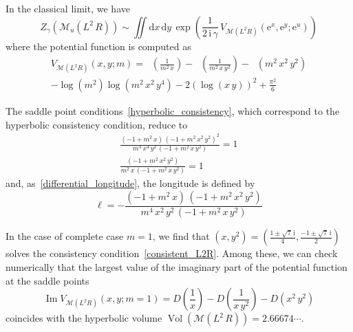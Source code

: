 \documentclass[12pt,reqno]{amsart}
\numberwithin{equation}{section}
\renewcommand{\Im}{\operatorname{Im}}
\DeclareMathOperator{\Li}{Li_2}
\DeclareMathOperator{\Vol}{Vol}
\newcommand{\I}{\mathrm{i}}
\newcommand{\E}{\mathrm{e}}
\begin{document}
In the classical limit, we have
\begin{equation}
  Z_\gamma \left( \mathcal{M}_u(L^2 \, R) \right)
  \sim
  \iint \mathrm{d} x \, \mathrm{d} y \,
  \exp \left(
    \frac{1}{2 \, \I \, \gamma} \,
    V_{\mathcal{M}(L^2 R)}(\E^x, \E^y; \E^u)
  \right)
\end{equation}
where  the potential function is computed as
\begin{multline}
  V_{\mathcal{M}(L^2 R)}(x,y;m)
  =
  \Li \left( \frac{1}{m^2 \, x} \right)
  - \Li \left( \frac{1}{ m^2 \, x \, y^2} \right)
  - \Li \left( m^2 \, x^2 \, y^2 \right)
  \\
  - \log \left( m^2 \right)
  \log \left( m^2 \, x^2 \, y^4 \right) 
  -
  2 \left(
    \log \left( x \, y \right)
  \right)^2 + \frac{\pi^2}{6}
\end{multline}



The saddle point conditions~\eqref{hyperbolic_consistency},
which correspond to the hyperbolic consistency condition,
reduce to
\begin{equation}
  \label{consistent_L2R}
  \begin{gathered}
    \frac{
      \left( -1 + m^2 \, x \right) \,
      \left( -1 + m^2 \, x^2 \, y^2 \right)^2
    }{
      m^4 \, x^4 \, y^2 \,
      \left( -1 + m^2 \, x \, y^2 \right)
    } = 1 \\[2mm]
%
    \frac{
      \left(-1 + m^2 \, x^2 \,y^2 \right)
    }{
      m^2 \, x \,  \left( -1 + m^2 \, x \, y^2  \right)
    }
    =1
  \end{gathered}
\end{equation}
and,
as~\eqref{differential_longitude},
the longitude is defined by
\begin{equation}
  \label{longitude_L2R}
  \ell =
  - \frac{
    ( -1 + m^2 \, x) \,
    ( -1 + m^2 \, x^2 \, y^2 )
  }{
    m^4 \, x^2 \, y^2 \, ( -1 + m^2 \, x \, y^2)
  }
\end{equation}

In the case of complete case $m=1$, we 
find that
$
(x,y^2)=
\left(
  \frac{1 \pm \sqrt{7} \, \I}{4},
  \frac{-1 \pm \sqrt{7} \, \I}{2}
\right)
$ solves the consistency condition~\eqref{consistent_L2R}.
Among these, we can check numerically that
the largest value
of the imaginary part of the potential function at the saddle points
\begin{equation*}
  \Im V_{\mathcal{M}(L^2 R)}(x,y;m=1)
  =
  D \left( \frac{1}{ x} \right)
  - D \left( \frac{1}{  x \, y^2} \right)
  - D \left(  x^2 \, y^2 \right)
\end{equation*}
 coincides
with the hyperbolic volume  
$\Vol \left(\mathcal{M}(L^2 \, R) \right)
= 2.66674 \cdots$.
\end{document}
